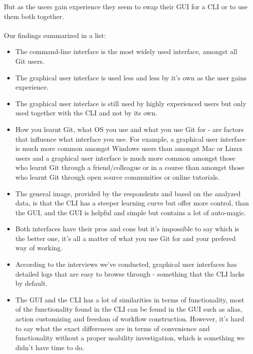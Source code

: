 \documentclass[a4paper,oneside]{bth} %
\begin{document}
				But as the users gain experience they seem to swap their GUI for a CLI or to use them both together.\\
				\\
				Our findings summarized in a list:
				\begin{itemize}
					\item The command-line interface is the most widely used interface, amongst all Git users.
					\item The graphical user interface is used less and less by it's own as the user gains experience.
					\item The graphical user interface is still used by highly experienced users but only used together with the CLI and not by its own.
					\item How you learnt Git, what OS you use and what you use Git for - are factors that influence what interface you use. For example, a graphical user interface is much more common amongst Windows users than amongst Mac or Linux users and a graphical user interface is much more common amongst those who learnt Git through a friend/colleague or in a course than amongst those who learnt Git through open source communities or online tutorials.
					\item The general image, provided by the respondents and based on the analyzed data, is that the CLI has a steeper learning curve but offer more control, than the GUI, and the GUI is helpful and simple but contains a lot of auto-magic.
					\item Both interfaces have their pros and cons but it's impossible to say which is the better one, it's all a matter of what you use Git for and your prefered way of working.
					\item According to the interviews we've conducted, graphical user interfaces has detailed logs that are easy to browse through - something that the CLI lacks by default.
					\item The GUI and the CLI has a lot of similarities in terms of functionality, most of the functionality found in the CLI can be found in the GUI such as alias, action customizing and freedom of workflow construction. However, it's hard to say what the exact differences are in terms of convenience and functionality without a proper usability investigation, which is something we didn't have time to do.				 
				\end{itemize}
				
		
\end{document}
